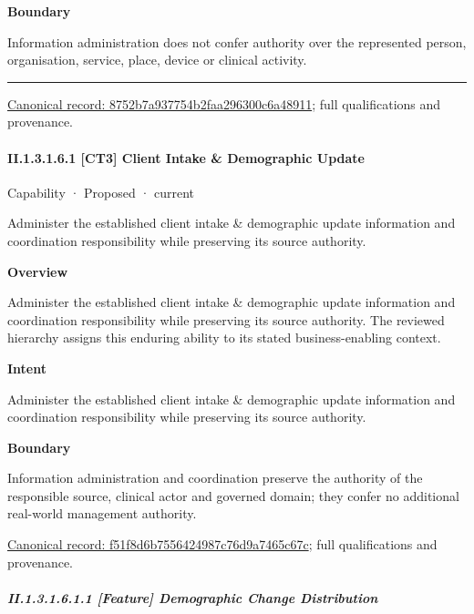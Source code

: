 \textbf{Boundary}



Information administration does not confer authority over the represented person, organisation, service, place, device or clinical activity.



\medskip\hrule\medskip

{\footnotesize \href{../../../../continuum/strategy/capability/8752b7a937754b2faa296300c6a48911.md}{Canonical record: 8752b7a937754b2faa296300c6a48911}; full qualifications and provenance.}\par
\paragraph*{II.1.3.1.6.1 [CT3] Client Intake \& Demographic Update}
\label{navigation:II.1.3.1.6.1}

\label{element:f51f8d6b7556424987c76d9a7465c67c}
{\small Capability · Proposed · current}\par

Administer the established client intake \& demographic update information and coordination responsibility while preserving its source authority.



\textbf{Overview}



Administer the established client intake \& demographic update information and coordination responsibility while preserving its source authority. The reviewed hierarchy assigns this enduring ability to its stated business-enabling context.



\textbf{Intent}



Administer the established client intake \& demographic update information and coordination responsibility while preserving its source authority.



\textbf{Boundary}



Information administration and coordination preserve the authority of the responsible source, clinical actor and governed domain; they confer no additional real-world management authority.


{\footnotesize \href{../../../../continuum/strategy/capability/f51f8d6b7556424987c76d9a7465c67c.md}{Canonical record: f51f8d6b7556424987c76d9a7465c67c}; full qualifications and provenance.}\par
\subparagraph*{II.1.3.1.6.1.1 [Feature] Demographic Change Distribution}
\label{navigation:II.1.3.1.6.1.1}

